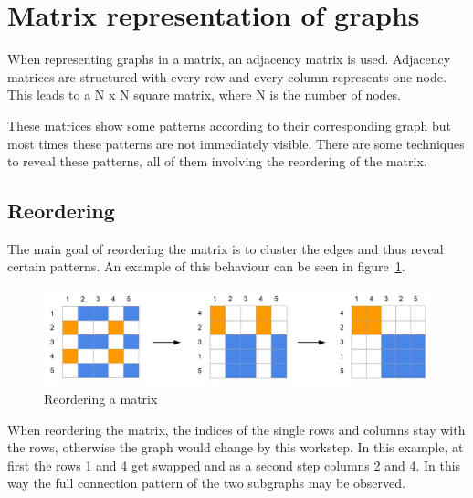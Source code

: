 \section{Matrix representation of graphs}

When representing graphs in a matrix, an adjacency matrix is used. Adjacency matrices are structured with every row and every column represents one node. This leads to a N x N square matrix, where N is the number of nodes. 

These matrices show some patterns according to their corresponding graph but most times these patterns are not immediately visible. There are some techniques to reveal these patterns, all of them involving the reordering of the matrix.


\subsection{Reordering}

The main goal of reordering the matrix is to cluster the edges and thus reveal certain patterns. An example of this behaviour can be seen in figure~\ref{fig:reorder}. 

\begin{figure}[h]
\includegraphics[width=\textwidth]{images/reorder}
\caption{Reordering a matrix\label{fig:reorder}}
\end{figure}


When reordering the matrix, the indices of the single rows and columns stay with the rows, otherwise the graph would change by this workstep. In this example, at first the rows 1 and 4 get swapped and as a second step columns 2 and 4. In this way the full connection pattern of the two subgraphs may be observed. 

